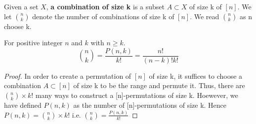 \begin{definition}
    Given a set $X$, \textbf{a combination of size k} is a subset $A \subset X$ of size k of $[n]$. 
    We let ${n \choose k}$ denote the number of combinations of size k of $[n]$. 
    We read ${n \choose k}$ as n choose k.
\end{definition}

\begin{theorem}
    For positive integer $n$ and $k$ with $n \geq k$. 
    $${n \choose k} =\frac{P(n,k)}{k!}=\frac{n!}{(n-k)!k!}$$
\end{theorem}

\begin{proof}
    In order to create a permutation of $[n]$ of size k, it suffices to choose a combination $A \subset [n]$ of size k to be the range and permute it. 
    Thus, there are ${n \choose k} \times k!$ many ways to construct a [n]-permutations of size k. 
    Hoewever, we have defined $P(n,k)$ as the number of [n]-permutations of size k. 
    Hence $P(n,k)={n \choose k} \times k!$ i.e. ${n \choose k}=\frac{P(n,k)}{k!}$
\end{proof}